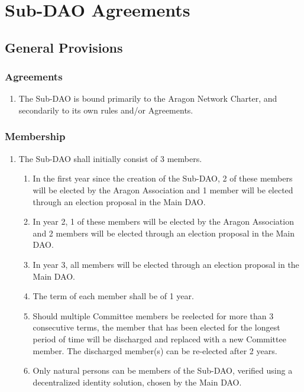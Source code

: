 
\chapter{Sub-DAO Agreements}
\label{chap:SubDAOAgreements}
\restartnumbering


\section{General Provisions}

\subsection{Agreements}
\begin{enumerate}
	\item The Sub-\ac{DAO} is bound primarily to the Aragon Network Charter, and secondarily to its own rules and/or Agreements.
\end{enumerate}


\subsection{Membership}

\begin{enumerate}
	\item The Sub-\ac{DAO} shall initially consist of 3 members.
	\begin{enumerate}
		\item In the first year since the creation of the Sub-\ac{DAO}, 2 of these members will be elected by the Aragon Association and 1 member will be elected through an election proposal in the Main \ac{DAO}.
		\item In year 2, 1 of these members will be elected by the Aragon Association and 2 members will be elected through an election proposal in the Main \ac{DAO}.
		\item In year 3, all members will be elected through an election proposal in the Main \ac{DAO}.
		\item The term of each member shall be of 1 year.
		\item Should multiple Committee members be reelected for more than 3 consecutive terms, the member that has been elected for the longest period of time will be discharged and replaced with a new Committee member.
		The discharged member(s) can be re-elected after 2 years.
		\item Only natural persons can be members of the Sub-\ac{DAO}, verified using a decentralized identity solution, chosen by the Main \ac{DAO}.
	\end{enumerate}
\end{enumerate}


